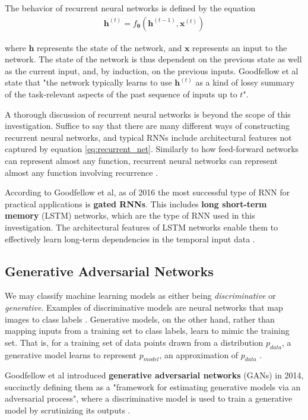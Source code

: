 \documentclass[12pt, titlepage]{report}
\theoremstyle{definition}
\begin{document}
The behavior of recurrent neural networks is defined by the equation
\begin{gather}\label{eq:recurrent_net}
\bm{h}^{(t)} = f_{\bm{\theta}}(\bm{h}^{(t - 1)}, \bm{x}^{(t)})
\end{gather}

where $\bm{h}$ represents the state of the network, and $\bm{x}$ represents an input to the network. The state of the network is thus dependent on the previous state as well as the current input, and, by induction, on the previous inputs. Goodfellow et al state that "the network typically learns to use $\bm{h}^{(t)}$ as a kind of lossy summary of the task-relevant aspects of the past sequence of inputs up to $t$"\cite{goodfellow2016deep}.

A thorough discussion of recurrent neural networks is beyond the scope of this investigation. Suffice to say that there are many different ways of constructing recurrent neural networks, and typical RNNs include architectural features not captured by equation \ref{eq:recurrent_net}. Similarly to how feed-forward networks can represent almost any function, recurrent neural networks can represent almost any function involving recurrence \cite[p. 370]{goodfellow2016deep}.

According to Goodfellow et al, as of 2016 the most successful type of RNN for practical applications is \textbf{gated RNNs}. This includes \textbf{long short-term memory} (LSTM) networks, which are the type of RNN used in this investigation. The architectural features of LSTM networks enable them to effectively learn long-term dependencies in the temporal input data \cite[p. 404-407]{goodfellow2016deep}.



\subsection{Generative Adversarial Networks}
We may classify machine learning models as either being \textit{discriminative} or \textit{generative}. Examples of discriminative models are neural networks that map images to class labels \cite[p. 1]{goodfellow2014generative}. Generative models, on the other hand, rather than mapping inputs from a training set to class labels, learn to mimic the training set. That is, for a training set of data points drawn from a distribution $p_{data}$, a generative model learns to represent $p_{model}$, an approximation of $p_{data}$ \cite{goodfellow2016nips}.

Goodfellow et al introduced \textbf{generative adversarial networks} (GANs) in 2014, succinctly defining them as a "framework for estimating generative models via an adversarial process", where a discriminative model is used to train a generative model by scrutinizing its outputs \cite{goodfellow2014generative}.
\end{document}
